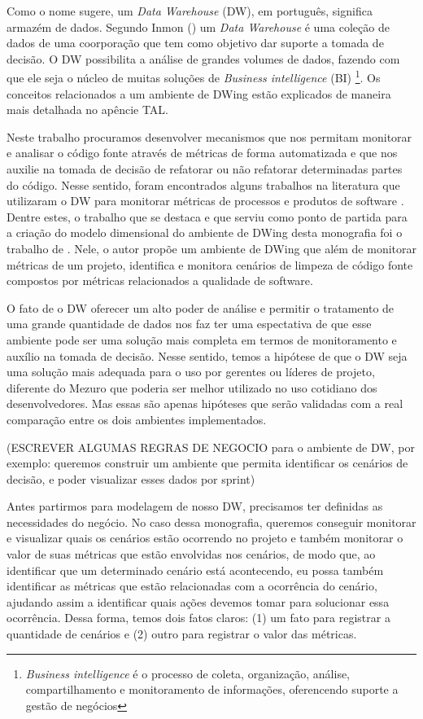 Como o nome sugere, um \emph{Data Warehouse} (DW), em português, significa armazém de dados. Segundo Inmon (\citeyear{inmon2002}) um \emph{Data Warehouse} é uma coleção de dados de uma coorporação que tem como objetivo dar suporte a tomada de decisão. 
%
O DW possibilita a análise de grandes volumes de dados, fazendo com que ele seja o núcleo de muitas soluções de \emph{Business intelligence} (BI)
%
\footnote{\emph{Business intelligence} é o processo de coleta, organização, análise, compartilhamento e monitoramento de informações, oferencendo suporte a gestão de negócios}. 
%
Os conceitos relacionados a um ambiente de DWing estão explicados de maneira mais detalhada no apêncie TAL.

Neste trabalho procuramos desenvolver mecanismos que nos permitam monitorar e analisar o código fonte através de métricas de forma automatizada e que nos auxilie na tomada de decisão de refatorar ou não refatorar determinadas partes do código. 
%
Nesse sentido, foram encontrados alguns trabalhos na literatura que utilizaram o DW para monitorar métricas de processos e produtos de software \cite{Folleco2007} \cite{Silveira2010}\cite{mazuco2011} \cite{rego2014}. Dentre estes, o trabalho que se destaca e que serviu como ponto de partida para a criação do modelo dimensional do ambiente de DWing desta monografia foi o trabalho de \cite{rego2014}. Nele, o autor propõe um ambiente de DWing que além de monitorar métricas de um projeto,  identifica e monitora cenários de limpeza de código fonte compostos por métricas relacionados a qualidade de software.

% 
O fato de o DW oferecer um alto poder de análise e permitir o tratamento de uma grande quantidade de dados nos faz ter uma espectativa de que esse ambiente pode ser uma solução mais completa em termos de monitoramento e auxílio na tomada de decisão. Nesse sentido, temos a hipótese de que o DW seja uma solução mais adequada para o uso por gerentes ou líderes de projeto, diferente do Mezuro que poderia ser melhor utilizado no uso cotidiano dos desenvolvedores. Mas essas são apenas hipóteses que serão validadas com a real comparação entre os dois ambientes implementados.

(ESCREVER ALGUMAS REGRAS DE NEGOCIO para o ambiente de DW, por exemplo: queremos construir um ambiente que permita identificar os cenários de decisão, e poder visualizar esses dados por sprint)


Antes partirmos para modelagem de nosso DW,  precisamos ter definidas as necessidades do negócio. No caso dessa monografia, queremos conseguir monitorar e visualizar quais os cenários estão ocorrendo no projeto e também monitorar o valor de suas métricas que estão envolvidas nos cenários, de modo que, ao identificar que um determinado cenário está acontecendo, eu possa também identificar as métricas que estão relacionadas com a ocorrência do cenário, ajudando assim a identificar quais ações devemos tomar para solucionar essa ocorrência. Dessa forma, temos dois fatos claros: (1) um fato para registrar a quantidade de cenários e (2) outro para registrar o valor das métricas.



